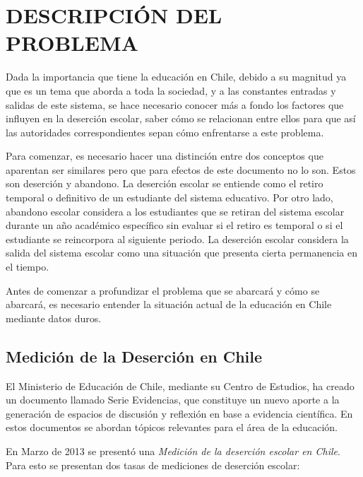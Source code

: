 \chapter{DESCRIPCIÓN DEL PROBLEMA}
\label{ch:descprob}
Dada la importancia que tiene la educación en Chile, debido a su magnitud ya que es un tema que aborda a toda la sociedad, y a las constantes entradas y salidas de este sistema, se hace necesario conocer más a fondo los factores que influyen en la deserción escolar, saber cómo se relacionan entre ellos para que así las autoridades correspondientes sepan cómo enfrentarse a este problema.

Para comenzar, es necesario hacer una distinción entre dos conceptos que aparentan ser similares pero que para efectos de este documento no lo son. Estos son deserción y abandono. La deserción escolar se entiende como el retiro temporal o definitivo de un estudiante del sistema educativo. Por otro lado, abandono escolar considera a los estudiantes que se retiran del sistema escolar durante un año académico específico sin evaluar si el retiro es temporal o si el estudiante se reincorpora al siguiente periodo. La deserción escolar considera la salida del sistema escolar como una situación que presenta cierta permanencia en el tiempo\cite{mineduc}.

Antes de comenzar a profundizar el problema que se abarcará y cómo se abarcará, es necesario entender la situación actual de la educación en Chile mediante datos duros.

\newpage

\section{Medición de la Deserción en Chile}

El Ministerio de Educación de Chile, mediante su Centro de Estudios, ha creado un documento llamado Serie Evidencias, que constituye un nuevo aporte a la generación de espacios de discusión y reflexión en base a evidencia científica. En estos documentos se abordan tópicos relevantes para el área de la educación.

En Marzo de 2013 se presentó una \textit{Medición de la deserción escolar en Chile}. Para esto se presentan dos tasas de mediciones de deserción escolar\cite{serieevidencias}:

